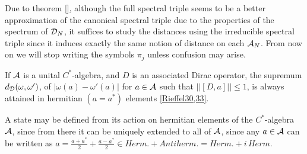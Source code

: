 







\linea

Due to theorem \ref{}, although the full spectral triple seems to be a better approximation of the canonical spectral triple due to the properties of the spectrum of $\mathcal D_N$, it suffices to study the distances using the irreducible spectral triple since it induces exactly the same notion of distance on each $\mathcal A_N$. From now on we will stop writing the symbols $\pi_j$ unless confusion may arise.

\begin{remark}
If $\mathcal A$ is a unital $C^*$-algebra, and $D$ is an associated Dirac operator, the supremum  $d_\mathcal D(\omega, \omega')$, of $|\omega(a) - \omega'(a)|$ for $a \in \mathcal A$ such that $||[D, a]|| \leq 1$, is always attained in hermitian $(a = a^*)$ elements \ref{Rieffel30,33}.
\end{remark}

\begin{remark}
A state may be defined from its action on hermitian elements of the $C^*$-algebra $\mathcal A$, since from there it can be uniquely extended to all of $\mathcal A$, since any $a \in \mathcal A$ can be written as $a = \frac{a+a^*}{2} + \frac{a - a^*}{2} \in Herm. + Antiherm. = Herm. + i\, Herm$.
\end{remark}

